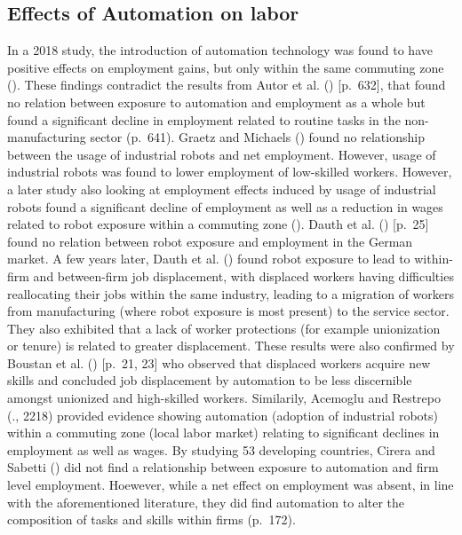 \documentclass[
  11,
  a4paperpaper,
]{article}
\begin{document}
\subsection{Effects of Automation on
labor}\label{sec-effects-of-automation-on-labor}

In a 2018 study, the introduction of automation technology was found to
have positive effects on employment gains, but only within the same
commuting zone (). These findings contradict the results from Autor et al.
() {[}p.~632{]}, that found no
relation between exposure to automation and employment as a whole but
found a significant decline in employment related to routine tasks in
the non-manufacturing sector (p.~641). Graetz and Michaels
() found no relationship
between the usage of industrial robots and net employment. However,
usage of industrial robots was found to lower employment of low-skilled
workers. However, a later study also looking at employment effects
induced by usage of industrial robots found a significant decline of
employment as well as a reduction in wages related to robot exposure
within a commuting zone (). Dauth et al.
() {[}p.~25{]} found no relation
between robot exposure and employment in the German market. A few years
later, Dauth et al. () found robot exposure to lead to within-firm and between-firm
job displacement, with displaced workers having difficulties
reallocating their jobs within the same industry, leading to a migration
of workers from manufacturing (where robot exposure is most present) to
the service sector. They also exhibited that a lack of worker
protections (for example unionization or tenure) is related to greater
displacement. These results were also confirmed by Boustan et al.
() {[}p.~21, 23{]} who
observed that displaced workers acquire new skills and concluded job
displacement by automation to be less discernible amongst unionized and
high-skilled workers. Similarily, Acemoglu and Restrepo
(., 2218) provided
evidence showing automation (adoption of industrial robots) within a
commuting zone (local labor market) relating to significant declines in
employment as well as wages. By studying 53 developing countries, Cirera
and Sabetti () did not
find a relationship between exposure to automation and firm level
employment. Hoewever, while a net effect on employment was absent, in
line with the aforementioned literature, they did find automation to
alter the composition of tasks and skills within firms (p.~172).
\end{document}
